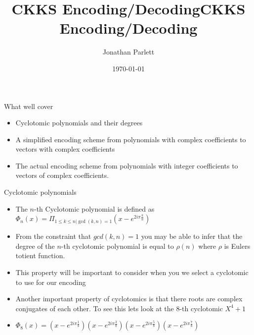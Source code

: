 \documentclass{beamer}
\title{CKKS Encoding/Decoding}
\author{Jonathan Parlett}
\date{\today}
\begin{document}
\begin{frame}
    \titlepage
	\title{CKKS Encoding/Decoding}
	\maketitle
\end{frame}


\begin{frame}{What well cover}
	\begin{itemize}[<+->]
		\item Cyclotomic polynomials and their degrees
		\item A simplified encoding scheme from polynomials with complex coefficients to
		vectors with complex coefficients
		\item The actual encoding scheme from polynomials with integer coefficients
		to vectors of complex coefficients. 
	\end{itemize}
\end{frame}

\begin{frame}{Cyclotomic polynomials}
	\begin{itemize}[<+->]
		\item The $n$-th Cyclotomic polynomial is defined as $\Phi_n(x) = \Pi_{1 \le k \le n | \gcd(k,n) = 1} (x - e^{2i\pi\frac{k}{n}})$
		\item From the constraint that $gcd(k,n) = 1$ you may be able to infer that the degree of the $n$-th
		cyclotomic polynomial is equal to $\rho(n)$ where $\rho$ is Eulers totient function.
		\item This property will be important to consider when you we select a cyclotomic to use for our
		encoding
		\item Another important property of cyclotomics is that there roots are complex conjugates
		of each other. To see this lets look at the 8-th cyclotomic $X^4 + 1$
		\item $\Phi_8(x) = (x - e^{2i \pi \frac{1}{8}})(x - e^{2i \pi \frac{3}{8}})(x - e^{2i \pi \frac{5}{8}})(x - e^{2i \pi \frac{7}{8}})$
	\end{itemize}
\end{frame}
\end{document}
